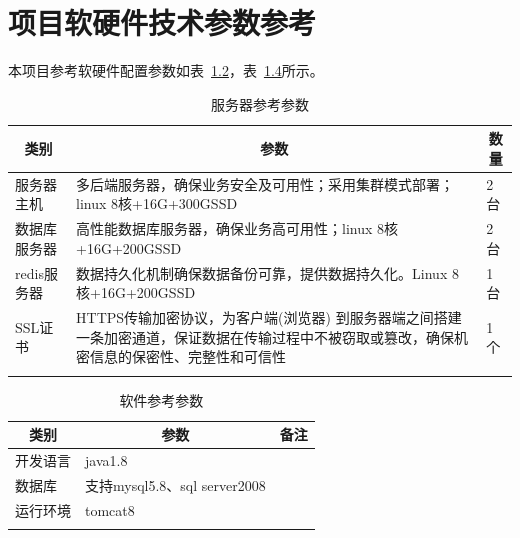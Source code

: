 \documentclass[12pt,a4paper,openany]{ctexrep}
\begin{document}
\chapter{项目软硬件技术参数参考}
本项目参考软硬件配置参数如表~\ref{server}，表~\ref{software}所示。
\begin{table}[htbp]
\begin{longtable}{p{3cm}|p{9.5cm}|p{1.5cm}}
\hline
\multicolumn{1}{c|}{类别}		&	\multicolumn{1}{c|}{参数}		&		\multicolumn{1}{c}{数量}\\
\hline
服务器主机		&	多后端服务器，确保业务安全及可用性；采用集群模式部署；linux 8核+16G+300GSSD	&	2台	\\
\hline
数据库服务器	&	高性能数据库服务器，确保业务高可用性；linux 8核+16G+200GSSD	&	2台\\	
\hline
redis服务器	&	数据持久化机制确保数据备份可靠，提供数据持久化。Linux 8核+16G+200GSSD	&	1台		\\
\hline
SSL证书			&	HTTPS传输加密协议，为客户端(浏览器) 到服务器端之间搭建一条加密通道，保证数据在传输过程中不被窃取或篡改，确保机密信息的保密性、完整性和可信性	&	1个\\
\hline
\caption{服务器参考参数}
\label{server}
\end{longtable}
\end{table}

\begin{table}[htbp]
\begin{longtable}{p{3cm}|p{9.5cm}|p{1.5cm}}
\hline
\multicolumn{1}{c|}{类别}	&	\multicolumn{1}{c|}{参数}	&	\multicolumn{1}{c}{备注}\\
\hline
开发语言		&	java1.8								&	\\
\hline
数据库			&	支持mysql5.8、sql server2008		&	\\	
\hline
运行环境		&	tomcat8								&	\\
\hline
\caption{软件参考参数}
\label{software}
\end{longtable}
\end{table}


\end{document}
